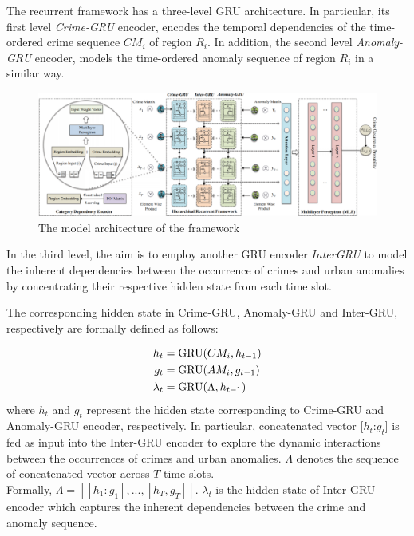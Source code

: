 The recurrent framework has a three-level GRU architecture. In
particular, its first level \emph{Crime-GRU} encoder, encodes the temporal
dependencies of the time-ordered crime sequence $CM_i$ of region $R_i$. In addition, the second level \emph{Anomaly-GRU} encoder, models the
time-ordered anomaly sequence of region $R_i$ in a similar way.
\begin{figure}[t]
	\begin{center}
	\includegraphics[width=.95\textwidth]{Chapter3/Plots_Chapter3/framework.png}
	\caption{The model architecture of the framework}
	\label{fig:framework}
	\end{center}
\end{figure}

In the third level, the aim is to employ another GRU encoder \emph{InterGRU} to model the inherent dependencies between the occurrence
of crimes and urban anomalies by concentrating their respective
hidden state from each time slot.

The corresponding hidden state in Crime-GRU, Anomaly-GRU and Inter-GRU, respectively are formally defined as follows:

\begin{align}
    h_t     &=      \text{GRU}(CM_i,h_{t-1})\notag\\
    g_t     &=      \text{GRU}(AM_i,g_{t-1})\notag\\
    \lambda_t &=    \text{GRU}(\Lambda,h_{t-1})
\end{align}
where $h_t$ and $g_t$ represent the hidden state corresponding to Crime-GRU and 
Anomaly-GRU encoder, respectively. In particular, 
concatenated vector [$h_t$:$g_t$] is fed as input into the Inter-GRU encoder to explore the dynamic interactions between the occurrences of crimes and urban anomalies. $\Lambda$ denotes the sequence of concatenated vector across $T$ time slots. \\Formally, $\Lambda = [[h_1:g_1],...,[h_T,g_T]]$. $\lambda_t$ is the hidden state of Inter-GRU encoder which captures the inherent dependencies between the crime and anomaly sequence.

